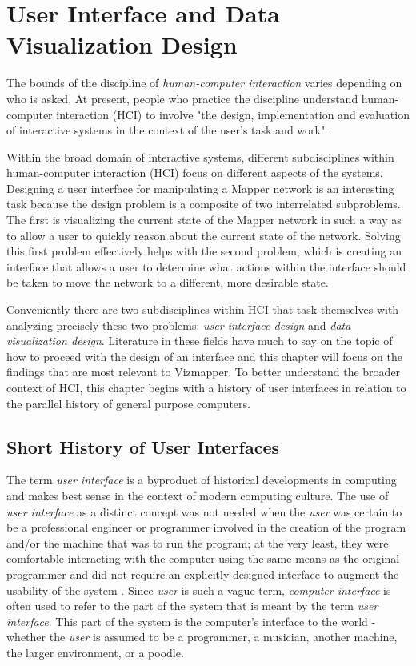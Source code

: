 \resetdatestamp

\chapter{User Interface and Data Visualization Design}

The bounds of the discipline of \emph{human-computer interaction} varies depending on who is asked. At present, people who practice the discipline understand human-computer interaction (HCI) to involve "the design, implementation and evaluation of interactive systems in the context of the user's task and work" \cite{hci1998}. 

Within the broad domain of interactive systems, different subdisciplines within human-computer interaction (HCI) focus on different aspects of the systems. Designing a user interface for manipulating a Mapper network is an interesting task because the design problem is a composite of two interrelated subproblems. The first is visualizing the current state of the Mapper network in such a way as to allow a user to quickly reason about the current state of the network. Solving this first problem effectively helps with the second problem, which is creating an interface that allows a user to determine what actions within the interface should be taken to move the network to a different, more desirable state. 

Conveniently there are two subdisciplines within HCI that task themselves with analyzing precisely these two problems: \emph{user interface design} and \emph{data visualization design}. Literature in these fields have much to say on the topic of how to proceed with the design of an interface and this chapter will focus on the findings that are most relevant to Vizmapper. To better understand the broader context of HCI, this chapter begins with a history of user interfaces in relation to the parallel history of general purpose computers.

\section{Short History of User Interfaces}

The term \emph{user interface} is a byproduct of historical developments in computing and makes best sense in the context of modern computing culture. The use of \emph{user interface} as a distinct concept was not needed when the \emph{user} was certain to be a professional engineer or programmer involved in the creation of the program and/or the machine that was to run the program; at the very least, they were comfortable interacting with the computer using the same means as the original programmer and did not require an explicitly designed interface to augment the usability of the system \cite{continuity1990}. Since \emph{user} is such a vague term, \emph{computer interface} is often used to refer to the part of the system that is meant by the term \emph{user interface}. This part of the system is the computer's interface to the world - whether the \emph{user} is assumed to be a programmer, a musician, another machine, the larger environment, or a poodle. 

